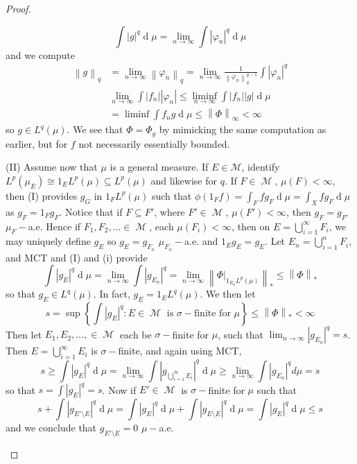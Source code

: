\documentclass[11pt, a4paper]{memoir}
\newcommand{\norm}[1]{\ensuremath{\left\lVert#1\right\rVert}}
\theoremstyle{change}
\theoremstyle{plain}
\theoremstyle{nonumberplain}
\newtheorem{proof}{Proof}
\DeclareMathOperator{\M}{{\mathcal{M}}}
\renewcommand{\d}[1]{\ensuremath{\operatorname{d}\!{#1}}}
\numberwithin{equation}{section}
\begin{document}
\begin{proof}
\begin{enumerate}[r]
\begin{equation*}
                \int|g|^q\d{\mu}=\lim_{n\to\infty}\int|\varphi_n|^q\d{\mu}
            \end{equation*}
            and we compute
            \begin{align*}
                \norm{g}_q&=\lim_{n\to\infty}\norm{\varphi_n}_q=\lim_{n\to\infty}\frac{1}{\norm{\varphi_n}_q^{q-1}}\int|\varphi_n|^q\\
                          &\lim_{n\to\infty}\int|f_n||\varphi_n|\leq\liminf_{n\to\infty}\int|f_n||g|\d{\mu}\\
                          &= \liminf\int f_ng\d{\mu}\leq\norm{\Phi}_\infty<\infty
            \end{align*}
            so $g\in L^q(\mu)$.
            We see that $\Phi=\Phi_g$ by mimicking the same computation as earlier, but for $f$ not necessarily essentially bounded.

            (II) Assume now that $\mu$ is a general measure.
            If $E\in\mathcal{M}$, identify $L^p(\mu_E)\cong 1_EL^p(\mu)\subseteq L^p(\mu)$ and likewise for $q$.
            If $F\in\M$, $\mu(F)<\infty$, then (I) provides $g_G$ in $1_FL^p(\mu)$ such that $\phi(1_Ff)=\int_F fg_F\d{\mu}=\int_X fg_F\d{\mu}$ as $g_F=1_Fg_F$.
            Notice that if $F\subseteq F'$, where $F'\in\M$, $\mu(F')<\infty$, then $g_F=g_{F'}$ $\mu_F-$a.e.
            Hence if $F_1,F_2,\ldots\in\M$, each $\mu(F_i)<\infty$, then on $E=\bigcup_{i=1}^\infty F_i$, we may uniquely define $g_E$ so $g_E=g_{F_n}$ $\mu_{F_n}-$a.e. and $1_Eg_E=g_E$.
            Let $E_n=\bigcup_{i=1}^n F_i$, and MCT and (I) and (i) provide
            \begin{equation*}
                \int|g_E|^q\d{\mu}=\lim_{n\to\infty}\int|g_{E_n}|^q=\lim_{n\to\infty}\norm{\Phi|_{1_{E_n}L^p(\mu)}}_*\leq\norm{\Phi}_*
            \end{equation*}
            so that $g_E\in L^q(\mu)$.
            In fact, $g_E=1_EL^q(\mu)$.
            We then let
            \begin{equation*}
                s=\sup\left\{\int|g_E|^q:E\in\M\text{ is $\sigma-$finite for $\mu$}\right\}\leq\norm{\Phi}_*<\infty
            \end{equation*}
            Then let $E_1,E_2,\ldots,\in\M$ each be $\sigma-$finite for $\mu$, such that $\lim_{n\to\infty}|g_{E_n}|^q=s$.
            Then $E=\bigcup_{i=1}^\infty E_i$ is $\sigma-$finite, and again using MCT,
            \begin{equation*}
                s\geq\int|g_E|^q\d{\mu}=\lim_{n\to\infty}\int|g_{\bigcup_{i=1}^\infty E_i}|^q\d{\mu}\geq\lim_{n\to\infty}\int|g_{E_n}|^qd{\mu}=s
            \end{equation*}
            so that $s=\int|g_E|^q=s$.
            Now if $E'\in\M$ is $\sigma-$finite for $\mu$ such that
            \begin{equation*}
                s+\int|g_{E'\setminus E}|^q\d{\mu}=\int|g_E|^q\d{\mu}+\int|g_{E\setminus E}|^q\d{\mu}=\int|g_E|^q\d{\mu}\leq s
            \end{equation*}
            and we conclude that $g_{E'\setminus E}=0$ $\mu-$a.e.


\end{enumerate}
\end{proof}
\end{document}
